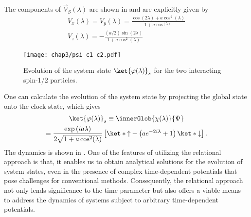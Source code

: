 The components of \(\vec{V}_S(\lambda)\) are shown in  and 
are explicitly given by 
\begin{equation}
    \begin{gathered}
        V_x(\lambda) = V_y(\lambda) = \frac{\cos(2\lambda) + a \cos^2(\lambda)}{1 + a\cos^(\lambda)}\\
        V_z(\lambda) = -\frac{(a/2)\sin(2\lambda)}{1 + a \cos^2(\lambda)}
    \end{gathered}
\end{equation}
\begin{figure}[!h]
    \centering
    \texttt{[image: chap3/psi\_c1\_c2.pdf]}
    \caption{Evolution of the system state \(\ket{\varphi(\lambda)}_s\) for the two interacting spin-1/2 particles. }
    \label{fig:2spin_interact_RQM}
\end{figure}


One can calculate the evolution of the system state by projecting the global state onto the clock state,
which gives
\begin{equation}
    \begin{gathered}
        \ket{\varphi(\lambda)}_s \equiv  \innerGlob{\chi(\lambda)}{\Psi} \\
        = \frac{\exp\left(i a\lambda\right)}{
            2\sqrt{1 + a \cos^2(\lambda)}} \left[\ket*{\uparrow} - 
            \left(a e^{-2i\lambda} + 1\right)\ket*{\downarrow}\right] .
    \end{gathered}
\end{equation}
The dynamics is shown in . 
One of the features of utilizing the relational approach is that, 
it enables us to obtain analytical solutions for the evolution of system states, even in the presence of complex time-dependent potentials that pose challenges for conventional methods. Consequently, the relational approach not only lends significance to the time parameter but also offers a viable means to address the dynamics of systems subject to arbitrary time-dependent potentials.



\newpage